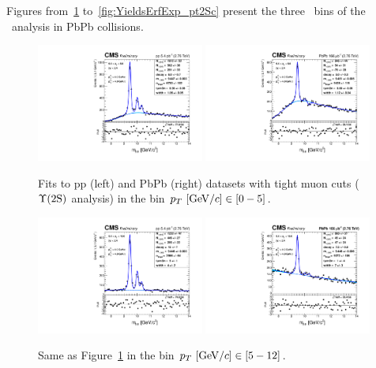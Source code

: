 Figures from~\ref{fig:YieldsErfExp_pt2Sa} to~\ref{fig:YieldsErfExp_pt2Sc}
present the three \pt\ bins of the \PgUb\ analysis in PbPb collisions.
\begin{figure}
  \includegraphics[width=0.49\textwidth]{Chapters/aYield/pp/pt_4_4/Pt/Pt_0_5/pp2p76tev_Pt_0_5_fsr1.pdf}  
  \includegraphics[width=0.49\textwidth]{Chapters/aYield/PbPb/pt_4_4/Pt/Pt_0_5/PbPb_Pt_0_5_fsr1.pdf}
  \caption{Fits to pp (left) and PbPb (right) datasets with tight muon cuts ($\Upsilon\mathrm{(2S)}$ analysis) in the bin $p_{T}~[{\rm GeV}/c]\in [0 - 5]$.}
  \label{fig:YieldsErfExp_pt2Sa} 
\end{figure}
\begin{figure}
  \includegraphics[width=0.49\textwidth]{Chapters/aYield/pp/pt_4_4/Pt/Pt_5_12/pp2p76tev_Pt_5_12_fsr1.pdf}  
  \includegraphics[width=0.49\textwidth]{Chapters/aYield/PbPb/pt_4_4/Pt/Pt_5_12/PbPb_Pt_5_12_fsr1.pdf} 
  \caption{Same as Figure~\ref{fig:YieldsErfExp_pt2Sa} in the bin $p_{T}~[{\rm GeV}/c]\in [5 - 12]$.}
  \label{fig:YieldsErfExp_pt2Sb} 
\end{figure}
